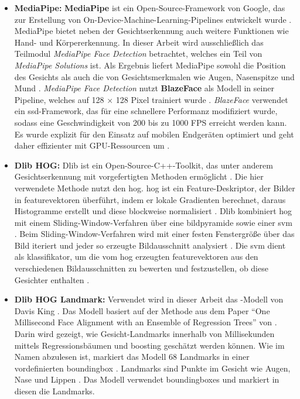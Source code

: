 \begin{itemize}
%	
	\item \textbf{MediaPipe:} \textbf{MediaPipe} ist ein Open-Source-Framework von Google, das zur Erstellung von On-Device-Machine-Learning-Pipelines entwickelt wurde \parencite{mediapipeFramework, mediapipeSolutions}. MediaPipe bietet neben der Gesichtserkennung auch weitere Funktionen wie Hand- und Körpererkennung. In dieser Arbeit wird ausschließlich das Teilmodul \textit{MediaPipe Face Detection} betrachtet, welches ein Teil von \textit{MediaPipe Solutions} ist. Als Ergebnis liefert MediaPipe sowohl die Position des Gesichts als auch die von Gesichtsmerkmalen wie Augen, Nasenspitze und Mund \parencite{mediapipeFace}. \textit{MediaPipe Face Detection} nutzt \textbf{BlazeFace} als Modell in seiner Pipeline, welches auf 128 × 128 Pixel trainiert wurde \parencite{mediapipeFace}. \textit{BlazeFace} verwendet ein \gls{ssd}-Framework, das für eine schnellere Performanz modifiziert wurde, sodass eine Geschwindigkeit von 200 bis zu 1000 FPS erreicht werden kann. Es wurde explizit für den Einsatz auf mobilen Endgeräten optimiert und geht daher effizienter mit GPU-Ressourcen um \parencite{Bazarevsky2019}.
%	
	\item \textbf{Dlib HOG:} Dlib ist ein Open-Source-C++-Toolkit, das unter anderem Gesichtserkennung mit vorgefertigten Methoden ermöglicht \parencite{dlib2022}. Die hier verwendete Methode \texttt{} nutzt den \gls{hog}. \gls{hog} ist ein Feature-Deskriptor, der Bilder in \gls{featurevektor}en überführt, indem er lokale Gradienten berechnet, daraus Histogramme erstellt und diese blockweise normalisiert \parencite{1467360}. Dlib kombiniert \gls{hog} mit einem Sliding-Window-Verfahren über eine \gls{bildpyramide} sowie einer \gls{svm} \parencite{trainObjectDetectoroD, faceDetectoroD}. Beim Sliding-Window-Verfahren wird mit einer festen Fenstergröße über das Bild iteriert und jeder so erzeugte Bildausschnitt analysiert \parencite{Esri2025SSD}. Die \gls{svm} dient als \gls{klassifikator}, um die vom \gls{hog} erzeugten \gls{featurevektor}en aus den verschiedenen Bildausschnitten zu bewerten und festzustellen, ob diese Gesichter enthalten \parencite{1467360}.
%	
	\item \textbf{Dlib HOG Landmark:} Verwendet wird in dieser Arbeit das -Modell von Davis King \parencite{King24}. Das Modell basiert auf der Methode aus dem Paper ``One Millisecond Face Alignment with an Ensemble of Regression Trees'' von \cite{Kazemi2014} \parencite{faceLandmarkDetectionoD}. Darin wird gezeigt, wie Gesicht-Landmarks innerhalb von Millisekunden mittels Regressionsbäumen und \gls{boosting} geschätzt werden können. Wie im Namen abzulesen ist, markiert das Modell 68 Landmarks in einer vordefinierten \gls{boundingbox} \parencite{DlibPythonoD}. Landmarks sind Punkte im Gesicht wie Augen, Nase und Lippen \parencite{faceLandmarkDetectionoD}. Das Modell verwendet \gls{boundingbox}es und markiert in diesen die Landmarks.

\end{itemize}
